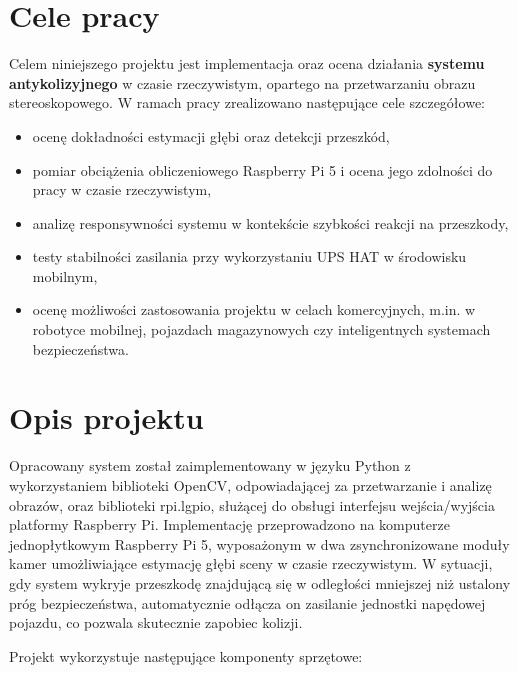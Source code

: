 \documentclass[magisterska]{pracadypl}
\begin{document}
\section*{Cele pracy}

Celem niniejszego projektu jest implementacja oraz ocena działania \textbf{systemu antykolizyjnego} w czasie rzeczywistym, opartego na przetwarzaniu obrazu stereoskopowego. W ramach pracy zrealizowano następujące cele szczegółowe:

\begin{itemize}
  \item ocenę dokładności estymacji głębi oraz detekcji przeszkód,
  \item pomiar obciążenia obliczeniowego Raspberry Pi 5 i ocena jego zdolności do pracy w czasie rzeczywistym,
  \item analizę responsywności systemu w kontekście szybkości reakcji na przeszkody,
  \item testy stabilności zasilania przy wykorzystaniu UPS HAT w środowisku mobilnym,
  \item ocenę możliwości zastosowania projektu w celach komercyjnych, m.in. w robotyce mobilnej, pojazdach magazynowych czy inteligentnych systemach bezpieczeństwa.
\end{itemize}

\section*{Opis projektu}

Opracowany system został zaimplementowany w języku Python z wykorzystaniem biblioteki OpenCV, odpowiadającej za przetwarzanie i analizę obrazów, oraz biblioteki rpi.lgpio, służącej do obsługi interfejsu wejścia/wyjścia platformy Raspberry Pi. Implementację przeprowadzono na komputerze jednopłytkowym Raspberry Pi 5, wyposażonym w dwa zsynchronizowane moduły kamer umożliwiające estymację głębi sceny w czasie rzeczywistym. W sytuacji, gdy system wykryje przeszkodę znajdującą się w odległości mniejszej niż ustalony próg bezpieczeństwa, automatycznie odłącza on zasilanie jednostki napędowej pojazdu, co pozwala skutecznie zapobiec kolizji.

Projekt wykorzystuje następujące komponenty sprzętowe:
\end{document}
